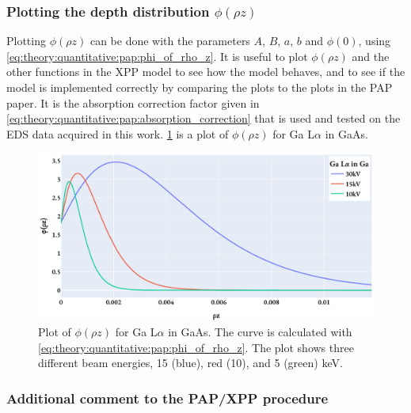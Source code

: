 \subsubsection{Plotting the depth distribution $\phi(\rho z)$} 

Plotting $\phi(\rho z)$ can be done with the parameters $A$, $B$, $a$, $b$ and $\phi(0)$, using \cref{eq:theory:quantitative:pap:phi_of_rho_z}.
It is useful to plot $\phi(\rho z)$ and the other functions in the XPP model to see how the model behaves, and to see if the model is implemented correctly by comparing the plots to the plots in the PAP paper.
It is the absorption correction factor given in \cref{eq:theory:quantitative:pap:absorption_correction} that is used and tested on the EDS data acquired in this work.
\cref{fig:pap:phi_of_rhoz} is a plot of $\phi(\rho z)$ for Ga L$\alpha$ in GaAs.

\begin{figure}[htbp]
    \centering
    \includegraphics[width=0.8\linewidth]{figures/PAP_phi_of_rhoz.pdf}
    \caption{
        Plot of $\phi(\rho z)$ for Ga L$\alpha$ in GaAs.
        The curve is calculated with \cref{eq:theory:quantitative:pap:phi_of_rho_z}.
        The plot shows three different beam energies, 15 (blue), red (10), and 5 (green) keV.
    }
    \label{fig:pap:phi_of_rhoz}
\end{figure}



\subsubsection{Additional comment to the PAP/XPP procedure}

